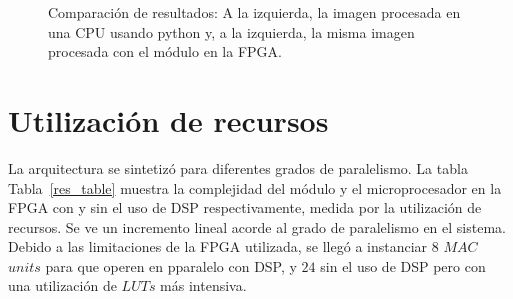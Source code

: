 \begin{figure}[!t]
\centering
{}
\hfil
{}
\hfil
{}
\caption{Comparación de resultados: A la izquierda, la imagen procesada en una CPU usando python y, a la
  izquierda, la misma imagen procesada con el módulo en la FPGA.}
\label{images_py_po}
\end{figure}

\section{Utilización de recursos}

La arquitectura se sintetizó para diferentes grados de paralelismo. La tabla
Tabla~\ref{res_table} muestra la complejidad del módulo y el microprocesador en
la FPGA con y sin el uso de DSP respectivamente, medida por la utilización de
recursos. Se ve un incremento lineal acorde al grado de paralelismo en el
sistema. Debido a las limitaciones de la FPGA utilizada, se llegó a instanciar
$8$ $MAC$ $units$ para que operen en pparalelo con DSP, y $24$ sin el uso de DSP
pero con una utilización de $LUTs$ más intensiva.

